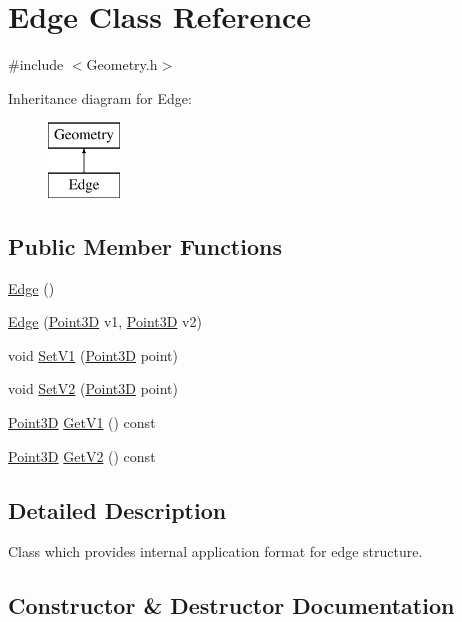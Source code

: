 \hypertarget{class_edge}{}\section{Edge Class Reference}
\label{class_edge}


{\ttfamily \#include $<$Geometry.\+h$>$}

Inheritance diagram for Edge\+:\begin{figure}[H]
\begin{center}
\leavevmode
\includegraphics[height=2.000000cm]{class_edge}
\end{center}
\end{figure}
\subsection*{Public Member Functions}
\begin{DoxyCompactItemize}
\item 
\hyperlink{class_edge_a3106b11d60125009dbf7a738ce540fdf}{Edge} ()
\item 
\hyperlink{class_edge_a7011d5e767aad79a7c3798c297660a75}{Edge} (\hyperlink{class_point3_d}{Point3D} v1, \hyperlink{class_point3_d}{Point3D} v2)
\item 
void \hyperlink{class_edge_a3c7909c0d93258c05e61fb1704c699ec}{Set\+V1} (\hyperlink{class_point3_d}{Point3D} point)
\item 
void \hyperlink{class_edge_af89cb05e0c7d9cbf31330e445a5d0752}{Set\+V2} (\hyperlink{class_point3_d}{Point3D} point)
\item 
\hyperlink{class_point3_d}{Point3D} \hyperlink{class_edge_a770284695e38a15103cc04ef4e3a2ff9}{Get\+V1} () const
\item 
\hyperlink{class_point3_d}{Point3D} \hyperlink{class_edge_a9be2780962afac8b55848ea1df3a28e9}{Get\+V2} () const
\end{DoxyCompactItemize}


\subsection{Detailed Description}
Class which provides internal application format for \textquotesingle{}edge\textquotesingle{} structure. 

\subsection{Constructor \& Destructor Documentation}
\hypertarget{class_edge_a3106b11d60125009dbf7a738ce540fdf}{}\label{class_edge_a3106b11d60125009dbf7a738ce540fdf} 
